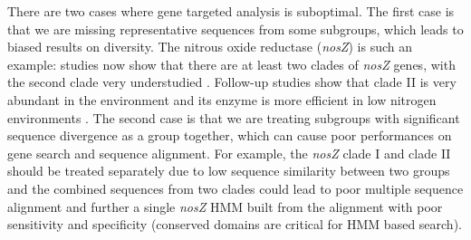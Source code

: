 \documentclass[]{msu-thesis}
\begin{document}
There are two cases where gene targeted analysis is suboptimal.  The
first case is that we are missing representative sequences from some
subgroups, which leads to biased results on diversity. The nitrous oxide
reductase (\textit{nosZ}) is such an example: studies now show that
there are at least two clades of \textit{nosZ} genes, with the second
clade very understudied \cite{sanford_unexpected_2012}. Follow-up
studies show that clade II is very abundant in the environment and its
enzyme is more efficient in low nitrogen environments
\cite{yoon_nitrous_2016}. The second case is that we are treating
subgroups with significant sequence divergence as a group together,
which can cause poor performances on gene search and sequence alignment.
For example, the \textit{nosZ} clade I and clade II should be treated
separately due to low sequence similarity between two groups and the
combined sequences from two clades could lead to poor multiple sequence
alignment and further a single \textit{nosZ} HMM built from the
alignment with poor sensitivity and specificity (conserved domains are
critical for HMM based search).

\end{document}
